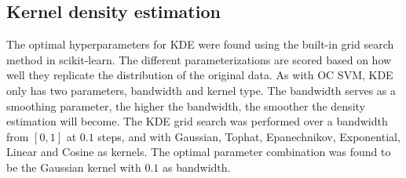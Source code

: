                 
                
            \subsection{Kernel density estimation}
                The optimal hyperparameters for KDE were found using the built-in grid search method in scikit-learn. The different parameterizations are scored based on how well they replicate the distribution of the original data. As with OC SVM, KDE only has two parameters, bandwidth and kernel type. The bandwidth serves as a smoothing parameter, the higher the bandwidth, the smoother the density estimation will become. The KDE grid search was performed over a bandwidth from $[0,1]$ at $0.1$ steps, and with Gaussian, Tophat, Epanechnikov, Exponential, Linear and Cosine as kernels. The optimal parameter combination was found to be the Gaussian kernel with $0.1$ as bandwidth. 
                
                
